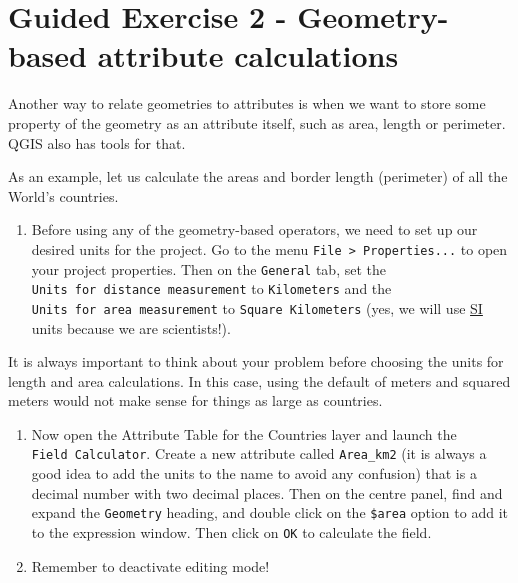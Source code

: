 \documentclass[
  letterpaper,
  DIV=11,
  numbers=noendperiod]{scrreprt}
\providecommand{\tightlist}{%
  \setlength{\itemsep}{0pt}\setlength{\parskip}{0pt}}\usepackage{longtable,booktabs,array}
\begin{document}
\section{Guided Exercise 2 - Geometry-based attribute
calculations}\label{guided-exercise-2---geometry-based-attribute-calculations}

Another way to relate geometries to attributes is when we want to store
some property of the geometry as an attribute itself, such as area,
length or perimeter. QGIS also has tools for that.

As an example, let us calculate the areas and border length (perimeter)
of all the World's countries.

\begin{enumerate}
\def\labelenumi{(\arabic{enumi})}
\setcounter{enumi}{117}
\tightlist
\item
  Before using any of the geometry-based operators, we need to set up
  our desired units for the project. Go to the menu
  \texttt{File\ \textgreater{}\ Properties...} to open your project
  properties. Then on the \texttt{General} tab, set the
  \texttt{Units\ for\ distance\ measurement} to \texttt{Kilometers} and
  the \texttt{Units\ for\ area\ measurement} to
  \texttt{Square\ Kilometers} (yes, we will use
  \href{https://en.wikipedia.org/wiki/International_System_of_Units}{SI}
  units because we are scientists!).
\end{enumerate}

It is always important to think about your problem before choosing the
units for length and area calculations. In this case, using the default
of meters and squared meters would not make sense for things as large as
countries.

\begin{enumerate}
\def\labelenumi{(\arabic{enumi})}
\setcounter{enumi}{118}
\item
  Now open the Attribute Table for the Countries layer and launch the
  \texttt{Field\ Calculator}. Create a new attribute called
  \texttt{Area\_km2} (it is always a good idea to add the units to the
  name to avoid any confusion) that is a decimal number with two decimal
  places. Then on the centre panel, find and expand the
  \texttt{Geometry} heading, and double click on the \texttt{\$area}
  option to add it to the expression window. Then click on \texttt{OK}
  to calculate the field.
\item
  Remember to deactivate editing mode!
\end{enumerate}
\end{document}
